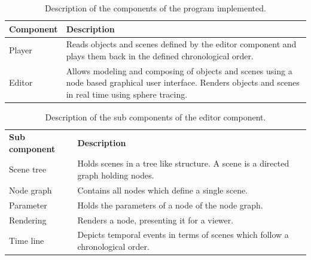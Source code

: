 \documentclass[%
    a4paper,    %
    justified,  %
    nobib,      %
    openany     %
]{tufte-book}
\begin{document}
\begin{table}[h]
  \begin{tabularx}{\textwidth}{lX}
    \toprule
    \textbf{Component} & \textbf{Description} \\
    \midrule
    Player & Reads objects and scenes defined by the editor component and plays
    them back in the defined chronological order.\\
    Editor & Allows modeling and composing of objects and
    scenes using a node based graphical user interface. Renders objects
    and scenes in real time using sphere tracing. \\
    \bottomrule
  \end{tabularx}
  \caption{Description of the components of the program implemented.}
  \label{table:software-components}
\end{table}

\begin{table}[h]
  \begin{tabularx}{\textwidth}{lX}
    \toprule
    \textbf{Sub component} & \textbf{Description} \\
    Scene tree & Holds scenes in a tree like structure. A scene is a directed
    graph holding nodes.                                           \\
    Node graph & Contains all nodes which define a single scene.   \\
    Parameter  & Holds the parameters of a node of the node graph. \\
    Rendering  & Renders a node, presenting it for a viewer.       \\
    Time line  & Depicts temporal events in terms of scenes which follow a
    chronological order.                                           \\
    \bottomrule
  \end{tabularx}
  \caption{Description of the sub components of the editor component.}
  \label{table:editor:sub-components}
\end{table}
\end{document}
